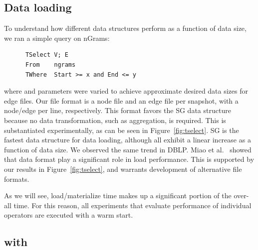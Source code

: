 \subsection{Data loading}

To understand how different data structures perform as a function of
data size, we ran a simple  query on nGrams:

\begin{small}
\begin{verbatim}
      TSelect V; E
      From    ngrams
      TWhere  Start >= x and End <= y
\end{verbatim}
\end{small}

\noindent where  and  parameters were varied to
achieve approximate desired data sizes for edge files.  Our file
format is a node file and an edge file per snapshot, with a node/edge
per line, respectively.  This format favors the SG data structure
because no data transformation, such as aggregation, is required.
This is substantiated experimentally, as can be seen in
Figure~\ref{fig:tselect}.  SG is the fastest data structure for data
loading, although all exhibit a linear increase as a function of data
size.  We observed the same trend in DBLP.  Miao et
al.~\cite{DBLP:journals/tos/MiaoHLWYZPCC15} showed that data format
play a significant role in load performance.  This is supported by our
results in Figure~\ref{fig:tselect}, and warrants development of
alternative file formats.

As we will see, load/materialize time makes up a significant portion
of the over-all time.  For this reason, all experiments that evaluate
performance of individual \ql operators are executed with a warm
start.



\subsection{ with }

